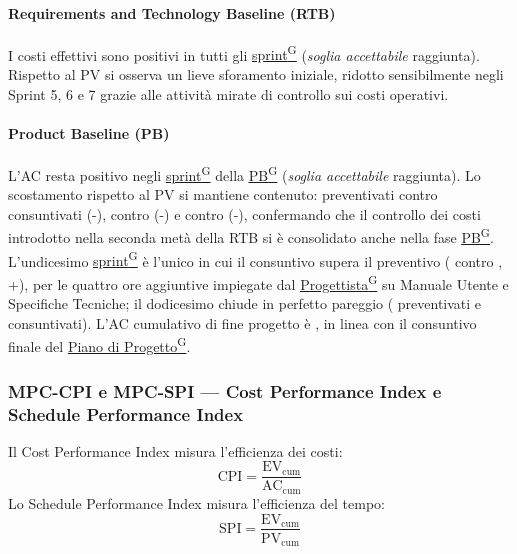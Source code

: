 \documentclass[a4paper,12pt]{article}
\providecommand{\glslink}[2]{\href{https://alittlebyte-19.github.io/Documentazione/glossario.html\#gls-#1}{\underline{#2}\textsuperscript{\scriptsize G}}}
\begin{document}
\paragraph*{Requirements and Technology Baseline (RTB)} I costi effettivi sono positivi in tutti gli \glslink{sprint}{sprint} (\emph{soglia accettabile} raggiunta). Rispetto al PV si osserva un lieve sforamento iniziale, ridotto sensibilmente negli Sprint 5, 6 e 7 grazie alle attività mirate di controllo sui costi operativi.

\paragraph*{Product Baseline (PB)} L'AC resta positivo negli \glslink{sprint}{sprint} della \glslink{pb-product-baseline}{PB} (\emph{soglia accettabile} raggiunta). Lo scostamento rispetto al PV si mantiene contenuto:  preventivati contro  consuntivati (-),  contro  (-) e  contro  (-), confermando che il controllo dei costi introdotto nella seconda metà della RTB si è consolidato anche nella fase \glslink{pb-product-baseline}{PB}. L'undicesimo \glslink{sprint}{sprint} è l'unico in cui il consuntivo supera il preventivo ( contro , +), per le quattro ore aggiuntive impiegate dal \glslink{progettista}{Progettista} su Manuale Utente e Specifiche Tecniche; il dodicesimo chiude in perfetto pareggio ( preventivati e consuntivati). L'AC cumulativo di fine progetto è , in linea con il consuntivo finale del \glslink{piano-di-progetto}{Piano di Progetto}.

\subsubsection{MPC-CPI e MPC-SPI — Cost Performance Index e Schedule Performance Index}

Il Cost Performance Index misura l'efficienza dei costi:
\[
  \text{CPI} = \frac{\text{EV}_\text{cum}}{\text{AC}_\text{cum}}
\]
Lo Schedule Performance Index misura l'efficienza del tempo:
\[
  \text{SPI} = \frac{\text{EV}_\text{cum}}{\text{PV}_\text{cum}}
\]
\end{document}
